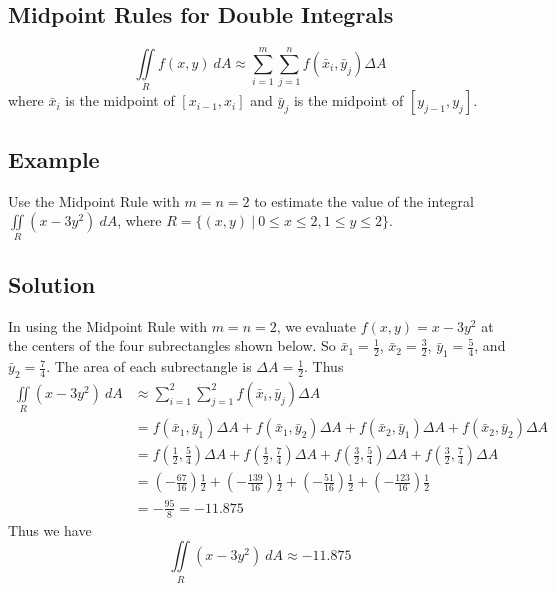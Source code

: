 \subsection*{Midpoint Rules for Double Integrals}
$$\iint\limits_R f(x,y)\:dA\approx\sum_{i=1}^m\sum_{j=1}^n f(\bar{x}_i,\bar{y}_j)\Delta A$$
where $\bar{x}_i$ is the midpoint of $[x_{i-1},x_i]$ and $\bar{y}_j$ is the midpoint
of $[y_{j-1},y_j]$.

\subsection*{Example}
Use the Midpoint Rule with $m=n=2$ to estimate the value of the integral
$\iint\limits_R (x-3y^2)\:dA$, where $R=\{(x,y)\:|\:0\leq x\leq 2, 1\leq y\leq 2\}$.

\subsection*{Solution}
In using the Midpoint Rule with $m=n=2$, we evaluate $f(x,y)=x-3y^2$ at the centers
of the four subrectangles shown below. So $\bar{x}_1=\frac{1}{2}$, $\bar{x}_2=\frac{3}{2}$,
$\bar{y}_1=\frac{5}{4}$, and $\bar{y}_2=\frac{7}{4}$. The area of each subrectangle
is $\Delta A=\frac{1}{2}$. Thus
\begin{align*}
    \iint\limits_R (x-3y^2)\:dA & \approx\sum_{i=1}^2\sum_{j=1}^2 f(\bar{x}_i,\bar{y}_j)\Delta A                                                                                                                           \\
                                & =f(\bar{x}_1,\bar{y}_1)\Delta A+f(\bar{x}_1,\bar{y}_2)\Delta A+f(\bar{x}_2,\bar{y}_1)\Delta A+f(\bar{x}_2,\bar{y}_2)\Delta A                                                             \\
                                & =f\left(\frac{1}{2},\frac{5}{4}\right)\Delta A+f\left(\frac{1}{2},\frac{7}{4}\right)\Delta A+f\left(\frac{3}{2},\frac{5}{4}\right)\Delta A+f\left(\frac{3}{2},\frac{7}{4}\right)\Delta A \\
                                & =\left(-\frac{67}{16}\right)\frac{1}{2}+\left(-\frac{139}{16}\right)\frac{1}{2}+\left(-\frac{51}{16}\right)\frac{1}{2}+\left(-\frac{123}{16}\right)\frac{1}{2}                           \\
                                & =-\frac{95}{8}=-11.875
\end{align*}
Thus we have
$$\iint\limits_R (x-3y^2)\:dA\approx -11.875$$


